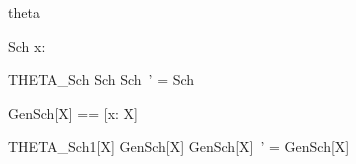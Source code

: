 \begin{zsection}
\SECTION theta 
\end{zsection}

\begin{schema}{Sch}
x: \nat
\end{schema}

\begin{schema}{THETA\_Sch}
    \Delta Sch 
\where
    \theta Sch~' = \theta Sch
\end{schema}

\begin{zed}
  GenSch[X] == [x: \power X]
\end{zed}

\begin{schema}{THETA\_Sch1}[X]
    \Delta GenSch[X] 
\where
    \theta GenSch[X]~' = \theta GenSch[X]
\end{schema}
